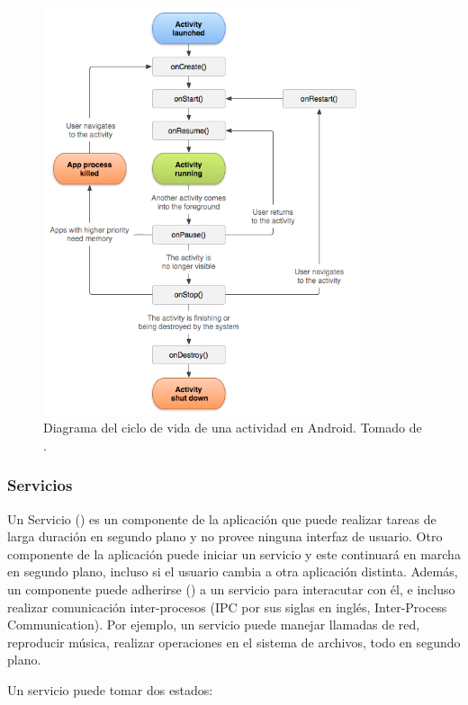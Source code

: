 \begin{figure}[h] \centering
    \includegraphics[height=12cm]{graphs/activity_lifecycle.png} \caption{Diagrama del ciclo de vida de una actividad en Android. Tomado de \cite{androiddevguide}.}\label{fig:diagrama:ActivityLifecycle}
\end{figure}

\subsubsection{Servicios}

Un Servicio () es un componente de la aplicación que puede realizar tareas de larga duración en segundo plano y no provee ninguna interfaz de usuario. Otro componente de la aplicación puede iniciar un servicio y este continuará en marcha en segundo plano, incluso si el usuario cambia a otra aplicación distinta. Además, un componente puede adherirse () a un servicio para interacutar con él, e incluso realizar comunicación inter-procesos (IPC por sus siglas en inglés, Inter-Process Communication). Por ejemplo, un servicio puede manejar llamadas de red, reproducir música, realizar operaciones en el sistema de archivos, todo en segundo plano.

Un servicio puede tomar dos estados:

